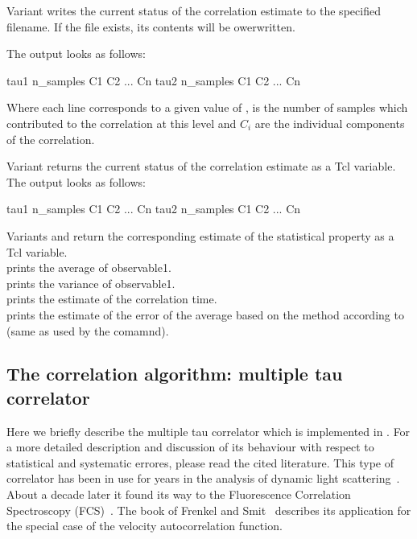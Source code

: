 Variant  writes the current status of the correlation
estimate to the specified filename. If the file exists, its contents will
be owerwritten.

The output looks as follows:
\begin{code}
tau1 n_samples C1 C2 ... Cn
tau2 n_samples C1 C2 ... Cn
\end{code}
Where each line corresponds to a given value of ,  is the number
of samples which contributed to the correlation at this level and $C_i$ are the individual
components of the correlation.

Variant  returns the current status of the correlation
estimate as a Tcl variable. 
The output looks as follows:
\begin{code}
{ tau1 n_samples C1 C2 ... Cn }
{ tau2 n_samples C1 C2 ... Cn }
\end{code}

Variants  and  return the corresponding
estimate of the statistical property as a Tcl variable.             \\
 prints the average of observable1.                   \\
 prints the variance of observable1.                 \\
 prints the estimate of the correlation time. \\
 prints the estimate of the error of the average based
on the method according to~\cite{wolff04a} (same as 
used by the  comamnd). 


\subsection{The correlation algorithm: multiple tau correlator}
\label{sec:multipleTau}

Here we briefly describe the multiple tau correlator which is implemented in \es.
For a more detailed description and discussion of its behaviour with respect to
statistical and systematic errores, please read the cited literature.
This type of correlator has been in use for years in the analysis of
dynamic light scattering~\cite{schatzel88a}. About a decade later it found its way
to the Fluorescence Correlation Spectroscopy (FCS)~\cite{magatti01a}.
The book of Frenkel and Smit~\cite{frenkel02b} describes its application
for the special case of the velocity autocorrelation function.


